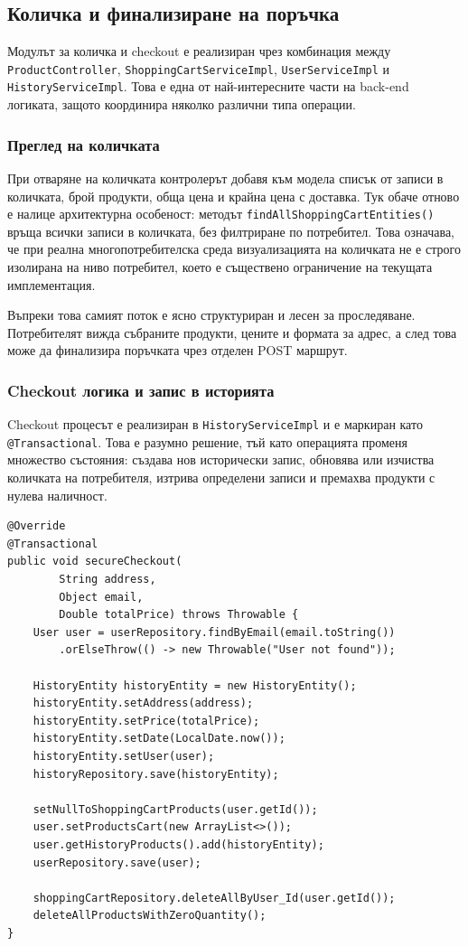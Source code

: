 \subsection{Количка и финализиране на поръчка}

Модулът за количка и checkout е реализиран чрез комбинация между \texttt{ProductController}, \texttt{ShoppingCartServiceImpl}, \texttt{UserServiceImpl} и \texttt{HistoryServiceImpl}. Това е една от най-интересните части на back-end логиката, защото координира няколко различни типа операции.

\subsubsection{Преглед на количката}

При отваряне на количката контролерът добавя към модела списък от записи в количката, брой продукти, обща цена и крайна цена с доставка. Тук обаче отново е налице архитектурна особеност: методът \texttt{findAllShoppingCartEntities()} връща всички записи в количката, без филтриране по потребител. Това означава, че при реална многопотребителска среда визуализацията на количката не е строго изолирана на ниво потребител, което е съществено ограничение на текущата имплементация.

Въпреки това самият поток е ясно структуриран и лесен за проследяване. Потребителят вижда събраните продукти, цените и формата за адрес, а след това може да финализира поръчката чрез отделен POST маршрут.

\subsubsection{Checkout логика и запис в историята}

Checkout процесът е реализиран в \texttt{HistoryServiceImpl} и е маркиран като \texttt{@Transactional}. Това е разумно решение, тъй като операцията променя множество състояния: създава нов исторически запис, обновява или изчиства количката на потребителя, изтрива определени записи и премахва продукти с нулева наличност.

\begin{lstlisting}[caption={Същност на checkout операцията},label={lst:checkout-service}]
@Override
@Transactional
public void secureCheckout(
        String address,
        Object email,
        Double totalPrice) throws Throwable {
    User user = userRepository.findByEmail(email.toString())
        .orElseThrow(() -> new Throwable("User not found"));

    HistoryEntity historyEntity = new HistoryEntity();
    historyEntity.setAddress(address);
    historyEntity.setPrice(totalPrice);
    historyEntity.setDate(LocalDate.now());
    historyEntity.setUser(user);
    historyRepository.save(historyEntity);

    setNullToShoppingCartProducts(user.getId());
    user.setProductsCart(new ArrayList<>());
    user.getHistoryProducts().add(historyEntity);
    userRepository.save(user);

    shoppingCartRepository.deleteAllByUser_Id(user.getId());
    deleteAllProductsWithZeroQuantity();
}
\end{lstlisting}


